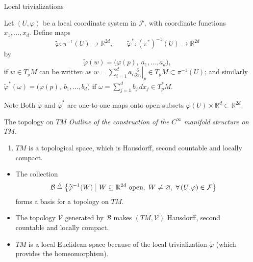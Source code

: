 \documentclass[10pt]{beamer}
\newcommand{\R}{\mathbb{R}}
\begin{document}
\begin{frame}{Local trivializations}
	\begin{definition}
		Let $(U, \varphi)$ be a local coordinate system in $\mathcal{F}$,
		with coordinate functions $x_1, \dots, x_d$. Define maps
		\[
			\widetilde{\varphi} : \pi^{-1}(U) \longrightarrow \R^{2d},
			\qquad
			\widetilde{\varphi}^* : (\pi^*)^{-1}(U) \longrightarrow \R^{2d}
		\]
		by
		\[
			\widetilde{\varphi}(w)
			= \bigl( \varphi(p),\ a_1, \dots, a_d \bigr),
		\]
		if $w \in T_p M$ can be written as
		$w = \sum_{i=1}^{d} a_i \left. \frac{\partial}{\partial x_i} \right|_{p}
			\in T_p M \subset \pi^{-1}(U)$; and similarly
		$\widetilde{\varphi}^*(\omega)
			= \bigl( \varphi(p),\ b_1, \dots, b_d \bigr)$
		if $\omega = \sum_{j=1}^{d} b_j\, dx_j \in T_p^* M$.
	\end{definition}
	\begin{block}{Note}
		Both $\widetilde{\varphi}$ and $\widetilde{\varphi}^*$ are
		one-to-one maps onto open subsets
		$\varphi(U) \times \R^d \subset \R^{2d}$.
	\end{block}
\end{frame}

\begin{frame}{The topology on $TM$}
	\emph{Outline of the construction of the $C^\infty$ manifold
		structure on $TM$.}
	\begin{enumerate}
		\item $TM$ is a topological space, which is Hausdorff, second
		      countable and locally compact.
	\end{enumerate}
	\begin{itemize}
		\item The collection
		      \[
			      \mathcal{B} \triangleq \bigl\{ \widetilde{\varphi}^{-1}(W)
			      \bigm| W \subseteq \R^{2d} \ \text{open},\ W \neq
			      \varnothing,\ \forall\, (U, \varphi) \in \mathcal{F} \bigr\}
		      \]
		      forms a basis for a topology on $TM$.
		\item The topology $\mathcal{V}$ generated by $\mathcal{B}$ makes
		      $(TM, \mathcal{V})$ Hausdorff, second countable and locally
		      compact.
		\item $TM$ is a local Euclidean space because of the local
		      trivialization $\widetilde{\varphi}$ (which provides the
		      homeomorphism).
	\end{itemize}
\end{frame}
\end{document}
